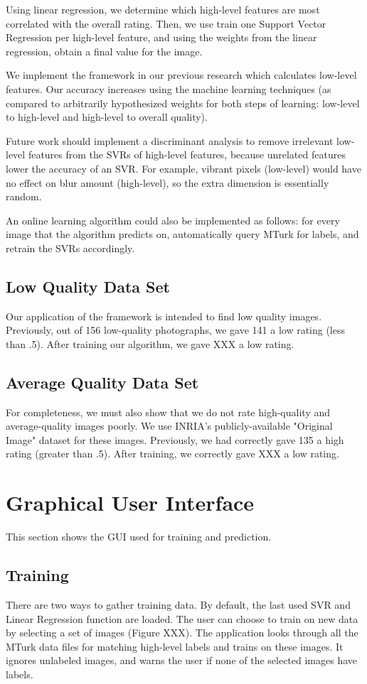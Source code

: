 \documentclass[11pt,letter]{article}
\begin{document}
Using linear regression, we determine which high-level features are most correlated with the overall rating. Then, we use train one Support Vector Regression per high-level feature, and using the weights from the linear regression, obtain a final value for the image.

We implement the framework in our previous research which calculates low-level features. Our accuracy increases using the machine learning techniques (as compared to arbitrarily hypothesized weights for both steps of learning: low-level to high-level and high-level to overall quality).

Future work should implement a discriminant analysis to remove irrelevant low-level features from the SVRs of high-level features, because unrelated features lower the accuracy of an SVR. For example, vibrant pixels (low-level) would have no effect on blur amount (high-level), so the extra dimension is essentially random.

An online learning algorithm could also be implemented as follows: for every image that the algorithm predicts on, automatically query MTurk for labels, and retrain the SVRs accordingly.

\subsection{Low Quality Data Set}
Our application of the framework is intended to find low quality images. Previously, out of 156 low-quality photographs, we gave 141 a low rating (less than .5). After training our algorithm, we gave XXX a low rating.

\subsection{Average Quality Data Set}
For completeness, we must also show that we do not rate high-quality and average-quality images poorly. We use INRIA's publicly-available "Original Image" dataset\cite{JDS08} for these images. Previously, we had correctly gave 135 a high rating (greater than .5). After training, we correctly gave XXX a low rating.

\appendix
\section{Graphical User Interface}
This section shows the GUI used for training and prediction.

\subsection{Training}
There are two ways to gather training data. By default, the last used SVR and Linear Regression function are loaded. The user can choose to train on new data by selecting a set of images (Figure XXX). The application looks through all the MTurk data files for matching high-level labels and trains on these images. It ignores unlabeled images, and warns the user if none of the selected images have labels.
\end{document}
